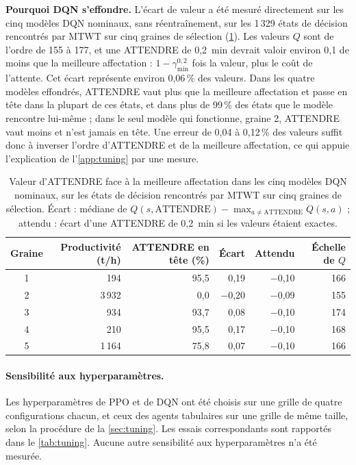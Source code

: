 \documentclass[11pt,a4paper]{article}
\newif\ifrevmarks
\newcommand{\revtag}[1]{\ifrevmarks\textsuperscript{\textcolor{red!70!black}{\scriptsize[#1]}}\fi}
\newenvironment{revbloc}[1]{\par\ifrevmarks\color{revcolor}\noindent\revtag{#1}\ \fi}{\par}
\newif\ifcorrmarks
\newcommand{\corr}[1]{\ifcorrmarks\textcolor{corrcolor}{#1}\else#1\fi}
\newenvironment{corrbloc}{\par\ifcorrmarks\color{corrcolor}\fi}{\par}
\begin{document}
\begin{revbloc}{T31}
\begin{corrbloc}
\textbf{Pourquoi DQN s'effondre.} L'écart de valeur a été mesuré directement sur les cinq modèles DQN nominaux, sans réentraînement, sur les 1\,329 états de décision rencontrés par MTWT sur cinq graines de sélection (\cref{tab:dqndiag}). Les valeurs $Q$ sont de l'ordre de 155 à 177, et une ATTENDRE de 0,2~min devrait valoir environ 0,1 de moins que la meilleure affectation : $1-\gamma_{\min}^{0,2}$ fois la valeur, plus le coût de l'attente. Cet écart représente environ 0,06\,\% des valeurs. Dans les quatre modèles effondrés, ATTENDRE vaut plus que la meilleure affectation et passe en tête dans la plupart de ces états, et dans plus de 99\,\% des états que le modèle rencontre lui-même ; dans le seul modèle qui fonctionne, graine 2, ATTENDRE vaut moins et n'est jamais en tête. Une erreur de 0,04 à 0,12\,\% des valeurs suffit donc à inverser l'ordre d'ATTENDRE et de la meilleure affectation, ce qui appuie l'explication de l'\corr{\cref{app:tuning}} par une mesure.

\begin{table}[H]
\centering
\caption{Valeur d'ATTENDRE face à la meilleure affectation dans les cinq modèles DQN nominaux, sur les états de décision rencontrés par MTWT sur cinq graines de sélection. Écart : médiane de $Q(s,\mathrm{ATTENDRE}) - \max_{a \neq \mathrm{ATTENDRE}} Q(s,a)$ ; attendu : écart d'une ATTENDRE de 0,2~min si les valeurs étaient exactes.}
\label{tab:dqndiag}
\small
\begin{tabular}{@{}crrrrr@{}}
\toprule
\textbf{Graine} & \textbf{Productivité (t/h)} & \textbf{\corr{ATTENDRE} en tête (\%)} & \textbf{Écart} & \textbf{Attendu} & \textbf{Échelle de $Q$} \\
\midrule
1 & 194 & 95{,}5 & 0{,}19 & $-$0{,}10 & 166 \\
2 & 3\,932 & 0{,}0 & $-$0{,}20 & $-$0{,}09 & 155 \\
3 & 934 & 93{,}7 & 0{,}08 & $-$0{,}10 & 174 \\
4 & 210 & 95{,}5 & 0{,}17 & $-$0{,}10 & 168 \\
5 & 1\,164 & 75{,}8 & 0{,}07 & $-$0{,}10 & 166 \\
\bottomrule
\end{tabular}
\end{table}
\end{corrbloc}
\end{revbloc}

\paragraph{Sensibilité aux hyperparamètres.}
\begin{revbloc}{T31}
Les hyperparamètres de PPO et de DQN ont été choisis sur une grille de quatre configurations chacun, et ceux des agents tabulaires sur une grille de même taille, selon la procédure de la \cref{sec:tuning}. Les essais correspondants sont rapportés dans le \cref{tab:tuning}. Aucune autre sensibilité aux hyperparamètres n'a été mesurée.
\end{revbloc}
\end{document}
